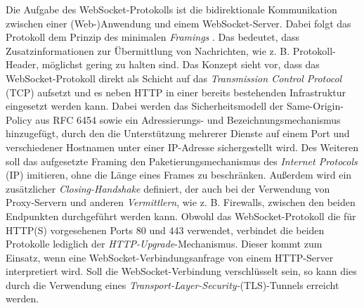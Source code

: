 \documentclass[11pt,a4paper,titlepage]{scrartcl}
\numberwithin{equation}{section}
\begin{document}
\noindent Die Aufgabe des WebSocket-Protokolls ist die bidirektionale Kommunikation zwischen einer (Web-)Anwendung und einem WebSocket-Server. Dabei folgt das Protokoll dem Prinzip des minimalen \textit{Framings} \autocite[9-10]{fette_websocket_2011}. Das bedeutet, dass Zusatzinformationen zur Übermittlung von Nachrichten, wie z. B. Protokoll-Header, möglichst gering zu halten sind. Das Konzept sieht vor, dass das WebSocket-Protokoll direkt als Schicht auf das \textit{Transmission Control Protocol} (TCP) aufsetzt und es neben HTTP in einer bereits bestehenden Infrastruktur eingesetzt werden kann. Dabei werden das Sicherheitsmodell der Same-Origin-Policy aus RFC 6454 sowie ein Adressierungs- und Bezeichnungsmechanismus hinzugefügt, durch den die Unterstützung mehrerer Dienste auf einem Port und verschiedener Hostnamen unter einer IP-Adresse sichergestellt wird. Des Weiteren soll das aufgesetzte Framing den Paketierungsmechanismus des \textit{Internet Protocols} (IP) imitieren, ohne die Länge eines Frames zu beschränken. Außerdem wird ein zusätzlicher \textit{Closing-Handshake} definiert, der auch bei der Verwendung von Proxy-Servern und anderen \textit{Vermittlern}, wie z. B. Firewalls, zwischen den beiden Endpunkten durchgeführt werden kann. Obwohl das WebSocket-Protokoll die für HTTP(S) vorgesehenen Ports 80 und 443 verwendet, verbindet die beiden Protokolle lediglich der \textit{HTTP-Upgrade}-Mechanismus. Dieser kommt zum Einsatz, wenn eine WebSocket-Verbindungsanfrage von einem HTTP-Server interpretiert wird. Soll die WebSocket-Verbindung verschlüsselt sein, so kann dies durch die Verwendung eines \textit{Transport-Layer-Security-}(TLS)-Tunnels erreicht werden.
\end{document}
